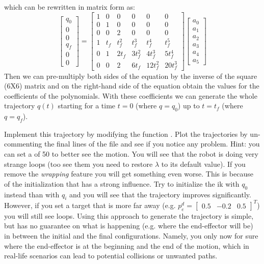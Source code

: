 \documentclass[11pt]{article}
\newcommand{\mat}[1]{\ensuremath{\begin{bmatrix}#1\end{bmatrix}}}	%
\begin{document}
%
which can be rewritten in matrix form as: 
\begin{equation*}
	\begin{bmatrix}
		q_0 \\
		0 \\
		0 \\
		q_f \\
		0 \\
		0
	\end{bmatrix} =
	\begin{bmatrix}
		1 & 0   & 0     &       0 &        0 &     0 \\
		0 &   1 &     0 &       0 &        0 &     0 \\
		0 &   0 &     2 &       0 &        0 &     0 \\
		1 & t_f & t_f^2 &   t_f^3 &    t_f^4 & t_f^5 \\
		0 &   1 & 2 t_f & 3 t_f^2 &  4 t_f^3 & 5 t_f^4 \\
		0 &   0 &     2 &   6 t_f & 12 t_f^2 & 20 t_f^3
	\end{bmatrix}
	\begin{bmatrix}
		a_0 \\
		a_1 \\ 
		a_2 \\
		a_3 \\
		a_4 \\
		a_5
	\end{bmatrix}
\end{equation*}
Then we can pre-multiply both sides of the equation by the inverse of the square (6X6) matrix and on the right-hand side of the equation obtain the values for the coefficients of the polynomials.
With these coefficients we can generate the whole trajectory $q(t)$ starting for a time $t=0$ (where $q = q_0$) up to $t=t_f$ (where  $q = q_f$).

Implement this trajectory by modifying the function . Plot the trajectories by un-commenting the final lines of the file  and see if you notice any problem. Hint: you can set a  of 50 to better see the motion. You will see that the robot is doing very strange loops (too see them you need to restore $\lambda$ to its default value). If you remove the \textit{wrapping} feature you will get something even worse. This is because of the initialization that has a strong influence. Try to initialize the ik with $q_0$ instead  than with $q_i$ and you will see that the trajectory improves significantly. However, if you set a target that is more far away (e.g.  $p^d_e =\mat{0.5 & -0.2 & 0.5}^T$) you will still see loops. 
Using this approach to generate the trajectory is simple, but has no guarantee on what is happening (e.g. where the end-effector will be) in between the initial and the final configurations.
Namely, you only now for sure where the end-effector is at the beginning and the end of the motion, which in real-life scenarios can lead to potential collisions or unwanted paths.
\end{document}
